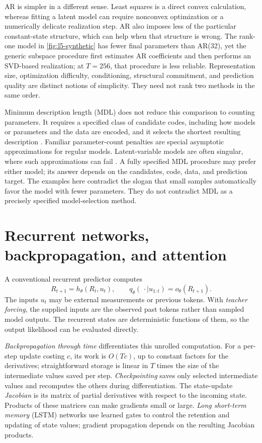 \documentclass[11pt,twoside]{article}
\theoremstyle{definition}
\theoremstyle{remark}
\begin{document}
AR is simpler in a different sense. Least squares is a direct convex
calculation, whereas fitting a latent model can require nonconvex optimization
or a numerically delicate realization step. AR also imposes less of the
particular constant-state structure, which can help when that structure is
wrong. The rank-one model in \cref{fig:l5-synthetic} has fewer final
parameters than AR(32), yet the generic subspace procedure first estimates AR
coefficients and then performs an SVD-based realization; at \(T=256\), that
procedure is less reliable. Representation size, optimization difficulty,
conditioning, structural commitment, and prediction quality are distinct
notions of simplicity. They need not rank two methods in the same order.

Minimum description length (MDL) does not reduce this comparison to counting
parameters. It requires a specified class of candidate codes, including how
models or parameters and the data are encoded, and it selects the shortest
resulting description \citep{barron1998}. Familiar parameter-count penalties
are special asymptotic approximations for regular models. Latent-variable
models are often singular, where such approximations can fail
\citep{watanabe2013}. A fully specified MDL procedure may prefer either model;
its answer depends on the candidates, code, data, and prediction target. The
examples here contradict the slogan that small samples automatically favor
the model with fewer parameters. They do not contradict MDL as a precisely
specified model-selection method.

\section{Recurrent networks, backpropagation, and attention}
\label{sec:rnn}

A conventional recurrent predictor computes
\[
 R_{t+1}=h_\theta(R_t,u_t),\qquad
 q_\theta(\,\cdot\mid u_{1:t})=o_\theta(R_{t+1}).
\]
The inputs \(u_t\) may be external measurements or previous tokens.
With \emph{teacher forcing}, the supplied inputs are the observed past
tokens rather than sampled model outputs. The recurrent
states are deterministic functions of them, so the output likelihood
can be evaluated directly.

\emph{Backpropagation through time} differentiates this unrolled
computation. For a per-step update costing \(c\), its work is
\(O(Tc)\), up to constant factors for the derivatives; straightforward
storage is linear in \(T\) times the size of the intermediate values saved
per step. \emph{Checkpointing} saves only selected intermediate values
and recomputes the others during differentiation.
The state-update \emph{Jacobian} is its matrix of partial derivatives
with respect to the incoming state. Products of these matrices can make
gradients small or large. \emph{Long short-term memory} (LSTM) networks
use learned gates to control the retention and updating of state values;
gradient propagation depends on the resulting Jacobian products.
\end{document}
